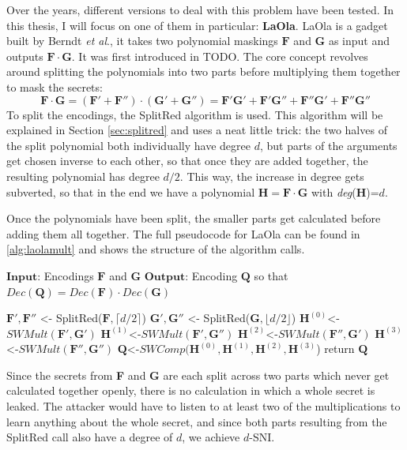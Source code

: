 \documentclass[english, version-2020-11]{uzl-thesis}
\makeatletter
\newcommand{\etal}[0]{\textit{et al}\@.\xspace}
\makeatother
\begin{document}
  Over the years, different versions to deal with this problem have been tested. In this thesis, I will focus on one of them in particular: \textbf{LaOla}.
    LaOla is a gadget built by Berndt \etal, it takes two polynomial maskings $\mathbf{F}$ and $\mathbf{G}$ as input and outputs $\mathbf{F}\cdot \mathbf{G}$. It was first introduced in TODO. The core concept revolves around splitting the polynomials into two parts before multiplying them together to mask the secrets:
    \[ \mathbf{F}\cdot \mathbf{G}=(\mathbf{F}'+\mathbf{F}'')\cdot(\mathbf{G}'+\mathbf{G}'')= \mathbf{F}'\mathbf{G}'+\mathbf{F}'\mathbf{G}''+\mathbf{F}''\mathbf{G}'+\mathbf{F}''\mathbf{G}''\] 
    To split the encodings, the SplitRed algorithm is used. This algorithm will be explained in Section \ref{sec:splitred} and uses a neat little trick: the two halves of the split polynomial both individually have degree $d$, but parts of the arguments get chosen inverse to each other, so that once they are added together, the resulting polynomial has degree $d/2$. This way, the increase in degree gets subverted, so that in the end we have a polynomial $\mathbf{H}=\mathbf{F}\cdot \mathbf{G}$ with \textit{deg}(\textbf{H})=$d$. 

    Once the polynomials have been split, the smaller parts get calculated before adding them all together. The full pseudocode for LaOla can be found in \ref{alg:laolamult} and shows the structure of the algorithm calls.


 \begin{Pseudocode}[caption={LaOlaMult as shown in \cite{eVer2026}}, label={alg:laolamult}]
    $\mathbf{Input}$: Encodings $\mathbf{F}$ and $\mathbf{G}$
    $\mathbf{Output}$: Encoding $\mathbf{Q}$ so that $Dec(\mathbf{Q})=Dec(\mathbf{F})\cdot Dec(\mathbf{G})$

    $\mathbf{F}', \mathbf{F}''$ <- SplitRed($\mathbf{F}, \lceil d/2 \rceil$)
    $\mathbf{G}', \mathbf{G}''$ <- SplitRed($\mathbf{G}, \lfloor d/2 \rfloor$)
    $\mathbf{H}^{(0)}$<-$ SWMult(\mathbf{F}', \mathbf{G}')$
    $\mathbf{H}^{(1)}$<-$ SWMult(\mathbf{F}', \mathbf{G}'')$
    $\mathbf{H}^{(2)}$<-$ SWMult(\mathbf{F}'', \mathbf{G}')$
    $\mathbf{H}^{(3)}$<-$ SWMult(\mathbf{F}'', \mathbf{G}'')$
    $\mathbf{Q}$<-$SWComp(\mathbf{H}^{(0)},\mathbf{H}^{(1)},\mathbf{H}^{(2)},\mathbf{H}^{(3)}$)
    return $\mathbf{Q}$
    \end{Pseudocode}


    Since the secrets from \textbf{F} and \textbf{G} are each split across two parts which never get calculated together openly, there is no calculation in which a whole secret is leaked.
    The attacker would have to listen to at least two of the multiplications to learn anything about the whole secret, and since both parts resulting from the SplitRed call also 
    have a degree of $d$, we achieve $d$-SNI.
\end{document}
